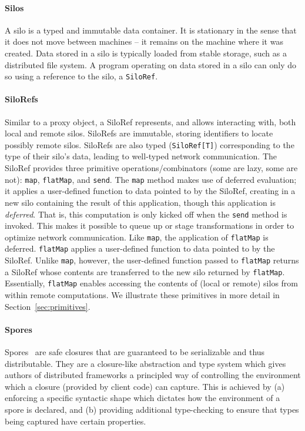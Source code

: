\documentclass{jfp1}
\begin{document}
\paragraph{Silos}

A silo is a typed and immutable data container. It is stationary in the sense
that it does not move between machines -- it remains on the machine where it was
created. Data stored in a silo is typically loaded from stable storage, such as
a distributed file system. A program operating on data stored in a silo can only
do so using a reference to the silo, a \verb|SiloRef|.

\paragraph{SiloRefs}

Similar to a proxy object, a SiloRef represents, and allows interacting with,
both local and remote silos. SiloRefs are immutable, storing identifiers to
locate possibly remote silos. SiloRefs are also typed (\verb|SiloRef[T]|)
corresponding to the type of their silo's data, leading to well-typed network
communication. The SiloRef provides three primitive operations/combinators (some
are lazy, some are not): \verb|map|, \verb|flatMap|, and \verb|send|. The
\verb|map| method makes use of deferred evaluation; it applies a user-defined
function to data pointed to by the SiloRef, creating in a new silo containing
the result of this application, though this application is \textit{deferred}.
That is, this computation is only kicked off when the \verb|send| method is
invoked. This makes it possible to queue up or stage transformations in order to
optimize network communication. Like \verb|map|, the application of
\verb|flatMap| is deferred. \verb|flatMap| applies a user-defined function to
data pointed to by the SiloRef. Unlike \verb|map|, however, the user-defined
function passed to \verb|flatMap| returns a SiloRef whose contents are
transferred to the new silo returned by \verb|flatMap|. Essentially,
\verb|flatMap| enables accessing the contents of (local or remote) silos from
within remote computations. We illustrate these primitives in more detail in
Section~\ref{sec:primitives}.

\paragraph{Spores}

Spores~\cite{Spores} are safe closures that are guaranteed to be serializable
and thus distributable. They are a closure-like abstraction and type system
which gives authors of distributed frameworks a principled way of controlling
the environment which a closure (provided by client code) can capture. This is
achieved by (a) enforcing a specific syntactic shape which dictates how the
environment of a spore is declared, and (b) providing additional type-checking
to ensure that types being captured have certain properties.
\end{document}
